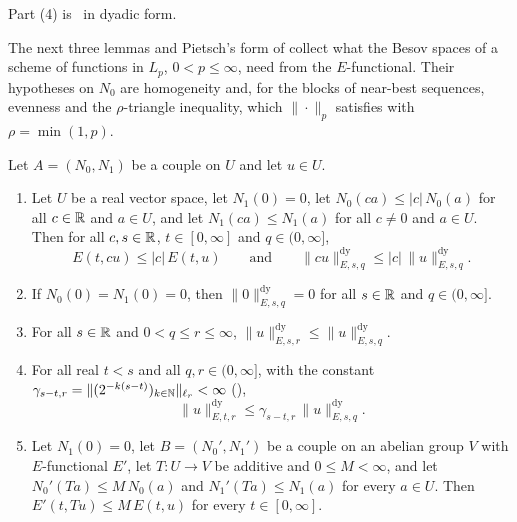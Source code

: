 Part (4) is~\cite[Lemma~7.1.6]{BerghLofstrom} in dyadic form.

The next three lemmas and Pietsch's form of  collect what the Besov
spaces of a scheme of functions in $L_p$, $0 < p \leq \infty$, need from the $E$-functional. Their
hypotheses on $N_0$ are homogeneity and, for the blocks of near-best sequences, evenness and the
$\rho$-triangle inequality, which $\|\cdot\|_p$ satisfies with $\rho = \min(1, p)$.

\begin{lemma}
\label{lem:e-method-calculus}
\leanok
{}
Let $A = (N_0, N_1)$ be a couple on $U$ and let $u \in U$.
\begin{enumerate}
  \item Let $U$ be a real vector space, let $N_1(0) = 0$, let $N_0(ca) \leq |c| \, N_0(a)$ for
    all $c \in \mathbb{R}$ and $a \in U$, and let $N_1(ca) \leq N_1(a)$ for all $c \neq 0$ and
    $a \in U$. Then for all $c, s \in \mathbb{R}$, $t \in [0, \infty]$ and $q \in (0, \infty]$,
    \[
      E(t, cu) \leq |c| \, E(t, u) \qquad \text{and} \qquad
      \|cu\|^{\mathrm{dy}}_{E, s, q} \leq |c| \, \|u\|^{\mathrm{dy}}_{E, s, q} .
    \]
  \item If $N_0(0) = N_1(0) = 0$, then $\|0\|^{\mathrm{dy}}_{E, s, q} = 0$ for all $s \in \mathbb{R}$ and
    $q \in (0, \infty]$.
  \item For all $s \in \mathbb{R}$ and $0 < q \leq r \leq \infty$,
    $\|u\|^{\mathrm{dy}}_{E, s, r} \leq \|u\|^{\mathrm{dy}}_{E, s, q}$.
  \item For all real $t < s$ and all $q, r \in (0, \infty]$, with the constant
    $\gamma_{s - t, r} = \|(2^{-k(s-t)})_{k \in \mathbb{N}}\|_{\ell_r} < \infty$ (),
    \[
      \|u\|^{\mathrm{dy}}_{E, t, r} \leq \gamma_{s - t, r} \, \|u\|^{\mathrm{dy}}_{E, s, q} .
    \]
  \item Let $N_1(0) = 0$, let $B = (N_0', N_1')$ be a couple on an abelian group $V$ with
    $E$-functional $E'$, let $T : U \to V$ be additive and $0 \leq M < \infty$, and let
    $N_0'(Ta) \leq M \, N_0(a)$ and $N_1'(Ta) \leq N_1(a)$ for every $a \in U$. Then
    $E'(t, Tu) \leq M \, E(t, u)$ for every $t \in [0, \infty]$.
\end{enumerate}
\end{lemma}

